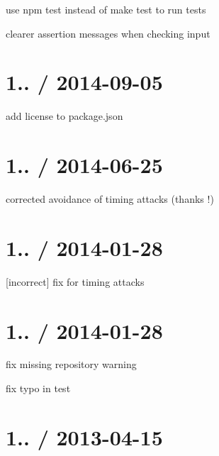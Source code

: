 
\begin{DoxyItemize}
\item use {\ttfamily npm test} instead of {\ttfamily make test} to run tests
\item clearer assertion messages when checking input
\end{DoxyItemize}

\section*{1.. / 2014-\/09-\/05 }


\begin{DoxyItemize}
\item add license to package.\+json
\end{DoxyItemize}

\section*{1.. / 2014-\/06-\/25 }


\begin{DoxyItemize}
\item corrected avoidance of timing attacks (thanks !)
\end{DoxyItemize}

\section*{1.. / 2014-\/01-\/28 }


\begin{DoxyItemize}
\item \mbox{[}incorrect\mbox{]} fix for timing attacks
\end{DoxyItemize}

\section*{1.. / 2014-\/01-\/28 }


\begin{DoxyItemize}
\item fix missing repository warning
\item fix typo in test
\end{DoxyItemize}

\section*{1.. / 2013-\/04-\/15 }


